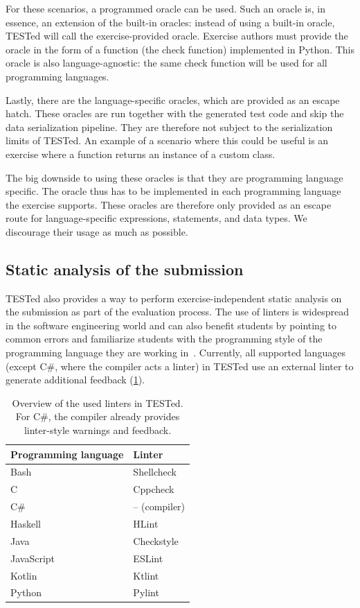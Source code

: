 \documentclass[../main]{subfiles}
\begin{document}
For these scenarios, a programmed oracle can be used.
Such an oracle is, in essence, an extension of the built-in oracles: instead of using a built-in oracle, TESTed will call the exercise-provided oracle.
Exercise authors must provide the oracle in the form of a function (the check function) implemented in Python.
This oracle is also language-agnostic: the same check function will be used for all programming languages.

Lastly, there are the language-specific oracles, which are provided as an escape hatch.
These oracles are run together with the generated test code and skip the data serialization pipeline.
They are therefore not subject to the serialization limits of TESTed.
An example of a scenario where this could be useful is an exercise where a function returns an instance of a custom class.

The big downside to using these oracles is that they are programming language specific.
The oracle thus has to be implemented in each programming language the exercise supports.
These oracles are therefore only provided as an escape route for language-specific expressions, statements, and data types.
We discourage their usage as much as possible.

\subsection{Static analysis of the submission}\label{subsec:static-analysis-of-the-submission}

TESTed also provides a way to perform exercise-independent static analysis on the submission as part of the evaluation process.
The use of linters is widespread in the software engineering world and can also benefit students by pointing to common errors and familiarize students with the programming style of the programming language they are working in~\autocite{alomarUseStaticAnalysis2023}.
Currently, all supported languages (except C\#, where the compiler acts a linter) in TESTed use an external linter to generate additional feedback (\cref{tab:linters}).

\begin{table}[h]
    \centering
    \caption{
        Overview of the used linters in TESTed.
        For C\#, the compiler already provides linter-style warnings and feedback.
    }
    \label{tab:linters}
    \begin{tabular}{|l|l|}
        \hline
        Programming language & Linter \\
        \hline
        Bash & Shellcheck  \\
        C & Cppcheck \\
        C\# & -- (compiler) \\
        Haskell & HLint \\
        Java & Checkstyle \\
        JavaScript & ESLint \\
        Kotlin & Ktlint \\
        Python & Pylint \\
        \hline
    \end{tabular}
\end{table}
\end{document}
